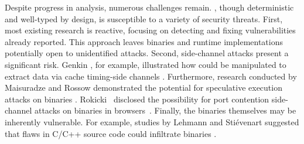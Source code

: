 \label{background:wasm:challenges} 
Despite progress in \Wasm analysis, numerous challenges remain. 
\Wasm, though deterministic and well-typed by design, is susceptible to a variety of security threats. 
First, most existing \Wasm research is reactive, focusing on detecting and fixing vulnerabilities already reported. 
This approach leaves \Wasm binaries and runtime implementations potentially open to unidentified attacks. 
Second, side-channel attacks present a significant risk. 
Genkin \etal, for example, illustrated how \Wasm could be manipulated to extract data via cache timing-side channels \cite{Genkin2018DrivebyKC}. 
Furthermore, research conducted by Maisuradze and Rossow demonstrated the potential for speculative execution attacks on \Wasm binaries \cite{ret2spec}. 
Rokicki \etal\ disclosed the possibility for port contention side-channel attacks on \Wasm binaries in browsers~\cite{10.1145/3488932.3517411}. 
Finally, the binaries themselves may be inherently vulnerable. 
For example, studies by Lehmann \etal and Stiévenart \etal suggested that flaws in C/C++ source code could infiltrate \Wasm binaries \cite{usenixWasm2020, DeRoover2022}.
 
